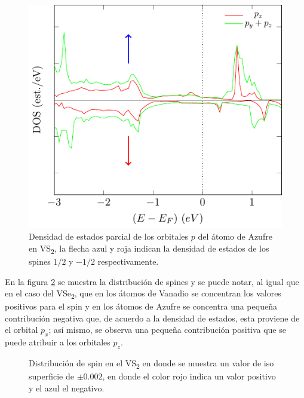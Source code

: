 \begin{figure}[!hbt]
	\centering
	\includegraphics[scale=1]{figRes/VS2/celdaU/estructura electronica/noSOC/pdosS.pdf}
	\caption[Densidad de estados proyectada de los orbitales $p$ del Azufre en el VS\textsubscript{2}.]{Densidad de estados parcial de los orbitales $p$ del \'atomo de Azufre en VS\textsubscript{2}, la flecha azul y roja indican la densidad de estados de los spines $1/2$ y $-1/2$ respectivamente.}
	\label{Sim:fig:pDOSsVs2}
\end{figure}
\par En la figura \ref{Sim:fig:distmagnVs2} se muestra la distribuci\'on de spines  y se puede notar, al igual que en el caso del VSe\textsubscript{2}, que en los \'atomos de Vanadio se concentran los  valores positivos para el spin y en los \'atomos de Azufre se concentra una peque\~na contribuci\'on negativa que, de acuerdo a la densidad de estados, esta proviene de el orbital $p_x$; as\'i mismo, se observa una peque\~na contribuci\'on positiva que se puede atribuir a los orbitales $p_z$.

 \begin{figure}[!hbt]
 	\centering
 	\caption[Densidad de spin en el VS\textsubscript{2}.]{Distribuci\'on  de spin en el VS\textsubscript{2} en donde se muestra un valor de iso superficie de $\pm 0.002$, en donde el color rojo indica un valor positivo y el azul el negativo.}
 	\label{Sim:fig:distmagnVs2}
 \end{figure}
